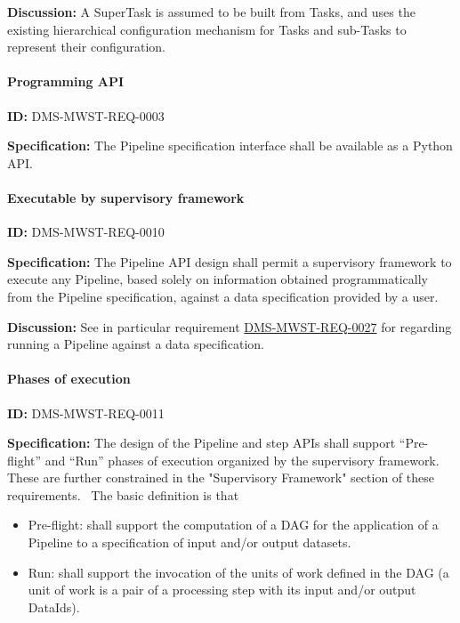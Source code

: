 \documentclass[SE,toc,lsstdraft]{lsstdoc}
\begin{document}
\textbf{Discussion:}
A SuperTask is assumed to be built from Tasks, and uses the existing hierarchical configuration mechanism for Tasks and sub-Tasks to represent their configuration.

\paragraph{Programming API}\hfill  %

\label{DMS-MWST-REQ-0003}
\textbf{ID:} DMS-MWST-REQ-0003

\textbf{Specification:}
The Pipeline specification interface shall be available as a Python API.

\paragraph{Executable by supervisory framework}\hfill  %

\label{DMS-MWST-REQ-0010}
\textbf{ID:} DMS-MWST-REQ-0010

\textbf{Specification:}
The Pipeline API design shall permit a supervisory framework to execute any Pipeline, based solely on information obtained programmatically from the Pipeline specification, against a data specification provided by a user.

\textbf{Discussion:}
See in particular requirement \hyperref[DMS-MWST-REQ-0027]{DMS-MWST-REQ-0027} for regarding running a Pipeline against a data specification.

\paragraph{Phases of execution}\hfill  %

\label{DMS-MWST-REQ-0011}
\textbf{ID:} DMS-MWST-REQ-0011

\textbf{Specification:}
The design of the Pipeline and step APIs shall support “Pre-flight” and “Run” phases of execution organized by the supervisory framework. These are further constrained in the "Supervisory Framework" section of these requirements.  The basic definition is that

    \begin{itemize}
\item
Pre-flight: shall support the computation of a DAG for the application of a Pipeline to a specification of input and/or output datasets.

\item
Run: shall support the invocation of the units of work defined in the DAG (a unit of work is a pair of a processing step with its input and/or output DataIds).

    \end{itemize}
\end{document}
